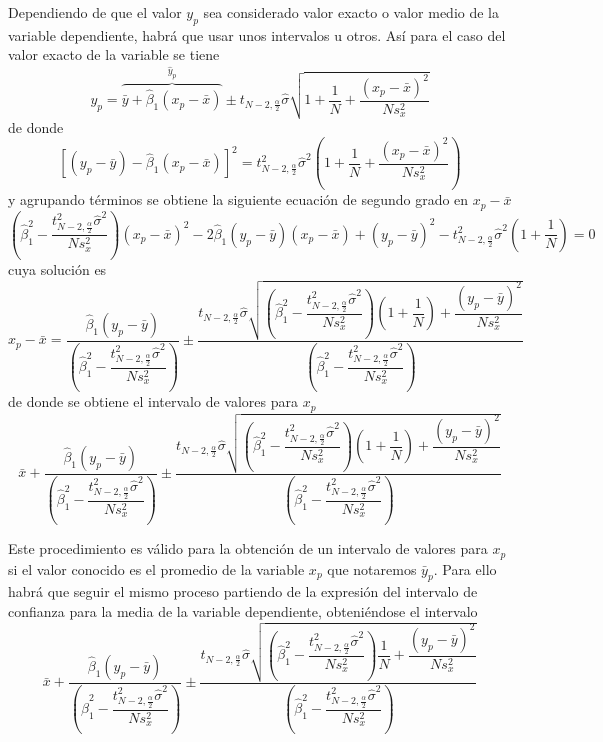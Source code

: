 \documentclass[10pt,a4paper]{book}
\begin{document}
Dependiendo de que el valor $y_p$ sea considerado valor exacto o valor medio de la variable dependiente, habrá que usar unos intervalos u otros. Así para el caso del valor exacto de la variable se tiene
$$y_p=\overbrace{\bar{y}+\widehat{\beta}_1(x_p-\bar{x})}^{\widehat{y}_p}\pm t_{N-2,\frac{\alpha}{2}}\widehat{\sigma}\sqrt{1+\dfrac{1}{N}+\dfrac{(x_p-\bar{x})^2}{Ns^2_x}}$$
de donde
$$\left[(y_p-\bar{y})-\widehat{\beta}_1(x_p-\bar{x})\right]^2=t^2_{N-2,\frac{\alpha}{2}}\widehat{\sigma}^2\left(1+\dfrac{1}{N}+\dfrac{(x_p-\bar{x})^2}{Ns^2_x}\right)$$
y agrupando términos se obtiene la siguiente ecuación de segundo grado en $x_p-\bar{x}$
$$\left(\widehat{\beta}^2_1-\dfrac{t^2_{N-2,\frac{\alpha}{2}}\widehat{\sigma}^2}{Ns^2_x}\right)(x_p-\bar{x})^2-2\widehat{\beta}_1(y_p-\bar{y})(x_p-\bar{x})+(y_p-\bar{y})^2-t^2_{N-2,\frac{\alpha}{2}}\widehat{\sigma}^2\left(1+\dfrac{1}{N}\right)=0$$
cuya solución es
$$x_p-\bar{x}=\dfrac{\widehat{\beta}_1(y_p-\bar{y})}{\left(\widehat{\beta}^2_1-\dfrac{t^2_{N-2,\frac{\alpha}{2}}\widehat{\sigma}^2}{Ns^2_x}\right)}\pm\dfrac{t_{N-2,\frac{\alpha}{2}}\widehat{\sigma}\sqrt{\left(\widehat{\beta}^2_1-\dfrac{t^2_{N-2,\frac{\alpha}{2}}\widehat{\sigma}^2}{Ns^2_x}\right)\left(1+\dfrac{1}{N}\right)+\dfrac{(y_p-\bar{y})^2}{Ns^2_x}}}{\left(\widehat{\beta}^2_1-\dfrac{t^2_{N-2,\frac{\alpha}{2}}\widehat{\sigma}^2}{Ns^2_x}\right)}$$
de donde se obtiene el intervalo de valores para $x_p$
$$\bar{x}+\dfrac{\widehat{\beta}_1(y_p-\bar{y})}{\left(\widehat{\beta}^2_1-\dfrac{t^2_{N-2,\frac{\alpha}{2}}\widehat{\sigma}^2}{Ns^2_x}\right)}\pm\dfrac{t_{N-2,\frac{\alpha}{2}}\widehat{\sigma}\sqrt{\left(\widehat{\beta}^2_1-\dfrac{t^2_{N-2,\frac{\alpha}{2}}\widehat{\sigma}^2}{Ns^2_x}\right)\left(1+\dfrac{1}{N}\right)+\dfrac{(y_p-\bar{y})^2}{Ns^2_x}}}{\left(\widehat{\beta}^2_1-\dfrac{t^2_{N-2,\frac{\alpha}{2}}\widehat{\sigma}^2}{Ns^2_x}\right)}$$

Este procedimiento es válido para la obtención de un intervalo de valores para $x_p$ si el valor conocido es el promedio de la variable $x_p$ que notaremos $\bar{y}_p$. Para ello habrá que seguir el mismo proceso partiendo de la expresión del intervalo de confianza para la media de la variable dependiente, obteniéndose el intervalo
$$\bar{x}+\dfrac{\widehat{\beta}_1(y_p-\bar{y})}{\left(\widehat{\beta}^2_1-\dfrac{t^2_{N-2,\frac{\alpha}{2}}\widehat{\sigma}^2}{Ns^2_x}\right)}\pm\dfrac{t_{N-2,\frac{\alpha}{2}}\widehat{\sigma}\sqrt{\left(\widehat{\beta}^2_1-\dfrac{t^2_{N-2,\frac{\alpha}{2}}\widehat{\sigma}^2}{Ns^2_x}\right)\dfrac{1}{N}+\dfrac{(y_p-\bar{y})^2}{Ns^2_x}}}{\left(\widehat{\beta}^2_1-\dfrac{t^2_{N-2,\frac{\alpha}{2}}\widehat{\sigma}^2}{Ns^2_x}\right)}$$
\ \\
\end{document}
